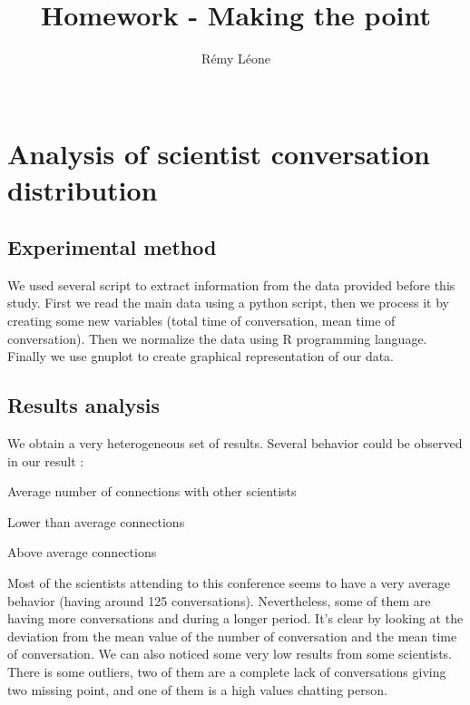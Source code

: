 \documentclass{sig-alternate-10pt}
\begin{document}
\title{Homework - Making the point}


\author{
  \alignauthor
    Rémy Léone\\
    \\
}

\maketitle

\section{Analysis of scientist conversation distribution}

\subsection{Experimental method}

We used several script to extract information from the data provided before this study.
First we read the main data using a python script, then we process it by creating some 
new variables (total time of conversation, mean time of conversation). Then we normalize
the data using R programming language. Finally we use gnuplot to create graphical representation
of our data.

\subsection{Results analysis}

We obtain a very heterogeneous set of results. Several behavior could be observed in our result :
\begin{description}
\item Average number of connections with other scientists
\item Lower than average connections
\item Above average connections
\end{description}

Most of the scientists attending to this conference seems to have a very average behavior
(having around 125 conversations). Nevertheless, some of them are having more conversations
and during a longer period. It's clear by looking at the deviation from the mean value of the 
number of conversation and the mean time of conversation. We can also noticed some very low
results from some scientists. There is some outliers, two of them are a complete lack of conversations
giving two missing point, and one of them is a high values chatting person.
\end{document}
